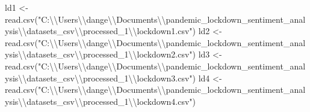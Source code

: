 \documentclass[
]{article}
\newenvironment{Shaded}{\begin{snugshade}}{\end{snugshade}}
\newcommand{\FunctionTok}[1]{\textcolor[rgb]{0.00,0.00,0.00}{#1}}
\newcommand{\NormalTok}[1]{#1}
\newcommand{\OtherTok}[1]{\textcolor[rgb]{0.56,0.35,0.01}{#1}}
\newcommand{\SpecialCharTok}[1]{\textcolor[rgb]{0.00,0.00,0.00}{#1}}
\newcommand{\StringTok}[1]{\textcolor[rgb]{0.31,0.60,0.02}{#1}}
\begin{document}
\begin{Shaded}
\begin{Highlighting}[]
\NormalTok{ld1 }\OtherTok{\textless{}{-}} \FunctionTok{read.csv}\NormalTok{(}\StringTok{"C:}\SpecialCharTok{\textbackslash{}\textbackslash{}}\StringTok{Users}\SpecialCharTok{\textbackslash{}\textbackslash{}}\StringTok{dange}\SpecialCharTok{\textbackslash{}\textbackslash{}}\StringTok{Documents}\SpecialCharTok{\textbackslash{}\textbackslash{}}\StringTok{pandemic\_lockdown\_sentiment\_analysis}\SpecialCharTok{\textbackslash{}\textbackslash{}}\StringTok{datasets\_csv}\SpecialCharTok{\textbackslash{}\textbackslash{}}\StringTok{processed\_1}\SpecialCharTok{\textbackslash{}\textbackslash{}}\StringTok{lockdown1.csv"}\NormalTok{)}
\NormalTok{ld2 }\OtherTok{\textless{}{-}} \FunctionTok{read.csv}\NormalTok{(}\StringTok{"C:}\SpecialCharTok{\textbackslash{}\textbackslash{}}\StringTok{Users}\SpecialCharTok{\textbackslash{}\textbackslash{}}\StringTok{dange}\SpecialCharTok{\textbackslash{}\textbackslash{}}\StringTok{Documents}\SpecialCharTok{\textbackslash{}\textbackslash{}}\StringTok{pandemic\_lockdown\_sentiment\_analysis}\SpecialCharTok{\textbackslash{}\textbackslash{}}\StringTok{datasets\_csv}\SpecialCharTok{\textbackslash{}\textbackslash{}}\StringTok{processed\_1}\SpecialCharTok{\textbackslash{}\textbackslash{}}\StringTok{lockdown2.csv"}\NormalTok{)}
\NormalTok{ld3 }\OtherTok{\textless{}{-}} \FunctionTok{read.csv}\NormalTok{(}\StringTok{"C:}\SpecialCharTok{\textbackslash{}\textbackslash{}}\StringTok{Users}\SpecialCharTok{\textbackslash{}\textbackslash{}}\StringTok{dange}\SpecialCharTok{\textbackslash{}\textbackslash{}}\StringTok{Documents}\SpecialCharTok{\textbackslash{}\textbackslash{}}\StringTok{pandemic\_lockdown\_sentiment\_analysis}\SpecialCharTok{\textbackslash{}\textbackslash{}}\StringTok{datasets\_csv}\SpecialCharTok{\textbackslash{}\textbackslash{}}\StringTok{processed\_1}\SpecialCharTok{\textbackslash{}\textbackslash{}}\StringTok{lockdown3.csv"}\NormalTok{)}
\NormalTok{ld4 }\OtherTok{\textless{}{-}} \FunctionTok{read.csv}\NormalTok{(}\StringTok{"C:}\SpecialCharTok{\textbackslash{}\textbackslash{}}\StringTok{Users}\SpecialCharTok{\textbackslash{}\textbackslash{}}\StringTok{dange}\SpecialCharTok{\textbackslash{}\textbackslash{}}\StringTok{Documents}\SpecialCharTok{\textbackslash{}\textbackslash{}}\StringTok{pandemic\_lockdown\_sentiment\_analysis}\SpecialCharTok{\textbackslash{}\textbackslash{}}\StringTok{datasets\_csv}\SpecialCharTok{\textbackslash{}\textbackslash{}}\StringTok{processed\_1}\SpecialCharTok{\textbackslash{}\textbackslash{}}\StringTok{lockdown4.csv"}\NormalTok{)}


\end{Highlighting}
\end{Shaded}
\end{document}
